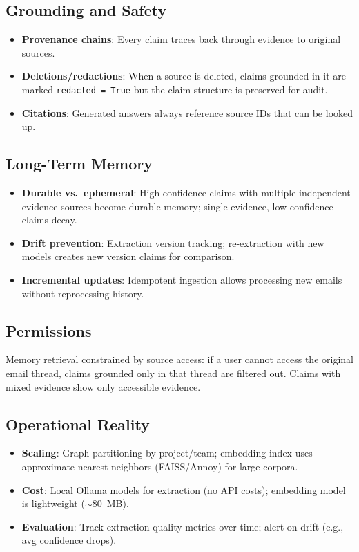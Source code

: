 \documentclass[11pt,a4paper]{article}
\begin{document}
\subsection{Grounding and Safety}
\begin{itemize}[nosep]
    \item \textbf{Provenance chains}: Every claim traces back through evidence to original sources.
    \item \textbf{Deletions/redactions}: When a source is deleted, claims grounded in it are marked \texttt{redacted = True} but the claim structure is preserved for audit.
    \item \textbf{Citations}: Generated answers always reference source IDs that can be looked up.
\end{itemize}

\subsection{Long-Term Memory}
\begin{itemize}[nosep]
    \item \textbf{Durable vs.\ ephemeral}: High-confidence claims with multiple independent evidence sources become durable memory; single-evidence, low-confidence claims decay.
    \item \textbf{Drift prevention}: Extraction version tracking; re-extraction with new models creates new version claims for comparison.
    \item \textbf{Incremental updates}: Idempotent ingestion allows processing new emails without reprocessing history.
\end{itemize}

\subsection{Permissions}
Memory retrieval constrained by source access: if a user cannot access the original email thread, claims grounded only in that thread are filtered out. Claims with mixed evidence show only accessible evidence.

\subsection{Operational Reality}
\begin{itemize}[nosep]
    \item \textbf{Scaling}: Graph partitioning by project/team; embedding index uses approximate nearest neighbors (FAISS/Annoy) for large corpora.
    \item \textbf{Cost}: Local Ollama models for extraction (no API costs); embedding model is lightweight ($\sim$80~MB).
    \item \textbf{Evaluation}: Track extraction quality metrics over time; alert on drift (e.g., avg confidence drops).
\end{itemize}
\end{document}

